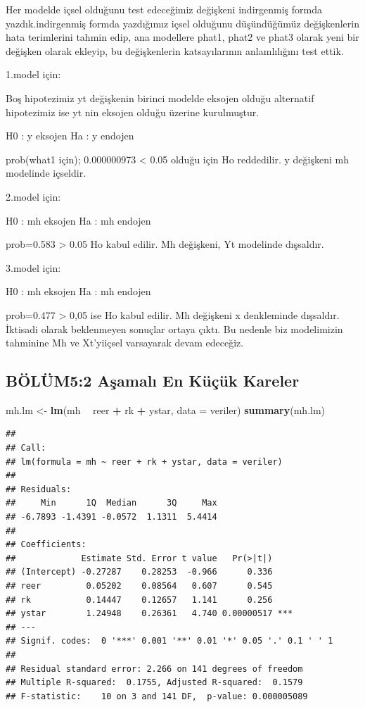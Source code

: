 \documentclass[]{article}
\newenvironment{Shaded}{\begin{snugshade}}{\end{snugshade}}
\newcommand{\KeywordTok}[1]{\textcolor[rgb]{0.13,0.29,0.53}{\textbf{#1}}}
\newcommand{\DataTypeTok}[1]{\textcolor[rgb]{0.13,0.29,0.53}{#1}}
\newcommand{\StringTok}[1]{\textcolor[rgb]{0.31,0.60,0.02}{#1}}
\newcommand{\OperatorTok}[1]{\textcolor[rgb]{0.81,0.36,0.00}{\textbf{#1}}}
\newcommand{\NormalTok}[1]{#1}
\begin{document}
Her modelde içsel olduğunu test edeceğimiz değişkeni indirgenmiş formda
yazdık.indirgenmiş formda yazdığımız içsel olduğunu düşündüğümüz
değişkenlerin hata terimlerini tahmin edip, ana modellere phat1, phat2
ve phat3 olarak yeni bir değişken olarak ekleyip, bu değişkenlerin
katsayılarının anlamlılığını test ettik.

1.model için:

Boş hipotezimiz yt değişkenin birinci modelde eksojen olduğu alternatif
hipotezimiz ise yt nin eksojen olduğu üzerine kurulmuştur.

H0 : y eksojen Ha : y endojen

prob(what1 için); 0.000000973 \textless{} 0.05 olduğu için Ho
reddedilir. y değişkeni mh modelinde içseldir.

2.model için:

H0 : mh eksojen Ha : mh endojen

prob=0.583 \textgreater{} 0.05 Ho kabul edilir. Mh değişkeni, Yt
modelinde dışsaldır.

3.model için:

H0 : mh eksojen Ha : mh endojen

prob=0.477 \textgreater{} 0,05 ise Ho kabul edilir. Mh değişkeni x
denkleminde dışsaldır. İktisadi olarak beklenmeyen sonuçlar ortaya
çıktı. Bu nedenle biz modelimizin tahminine Mh ve Xt'yiiçsel varsayarak
devam edeceğiz.

\subsection{BÖLÜM5:2 Aşamalı En Küçük
Kareler}\label{bolum52-asamal-en-kucuk-kareler}

\begin{Shaded}
\begin{Highlighting}[]
\NormalTok{mh.lm <-}\StringTok{ }\KeywordTok{lm}\NormalTok{(mh }\OperatorTok{~}\StringTok{ }\NormalTok{reer }\OperatorTok{+}\StringTok{ }\NormalTok{rk }\OperatorTok{+}\StringTok{ }\NormalTok{ystar, }\DataTypeTok{data =}\NormalTok{ veriler)}
\KeywordTok{summary}\NormalTok{(mh.lm)}
\end{Highlighting}
\end{Shaded}

\begin{verbatim}
## 
## Call:
## lm(formula = mh ~ reer + rk + ystar, data = veriler)
## 
## Residuals:
##     Min      1Q  Median      3Q     Max 
## -6.7893 -1.4391 -0.0572  1.1311  5.4414 
## 
## Coefficients:
##             Estimate Std. Error t value   Pr(>|t|)    
## (Intercept) -0.27287    0.28253  -0.966      0.336    
## reer         0.05202    0.08564   0.607      0.545    
## rk           0.14447    0.12657   1.141      0.256    
## ystar        1.24948    0.26361   4.740 0.00000517 ***
## ---
## Signif. codes:  0 '***' 0.001 '**' 0.01 '*' 0.05 '.' 0.1 ' ' 1
## 
## Residual standard error: 2.266 on 141 degrees of freedom
## Multiple R-squared:  0.1755, Adjusted R-squared:  0.1579 
## F-statistic:    10 on 3 and 141 DF,  p-value: 0.000005089
\end{verbatim}
\end{document}
